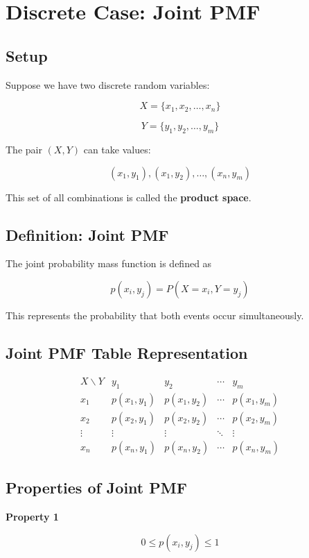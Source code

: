 \documentclass[12pt,a4paper]{article}
\begin{document}
\section{Discrete Case: Joint PMF}

\subsection{Setup}

Suppose we have two discrete random variables:

\[
X = \{x_1, x_2, \ldots, x_n\}
\]

\[
Y = \{y_1, y_2, \ldots, y_m\}
\]

The pair $(X,Y)$ can take values:

\[
(x_1,y_1),(x_1,y_2),\ldots,(x_n,y_m)
\]

This set of all combinations is called the \textbf{product space}.

\subsection{Definition: Joint PMF}

The joint probability mass function is defined as

\[
p(x_i,y_j)=P(X=x_i,Y=y_j)
\]

This represents the probability that both events occur simultaneously.

\subsection{Joint PMF Table Representation}

\[
\begin{array}{c|cccc}
X\backslash Y & y_1 & y_2 & \cdots & y_m\\
\hline
x_1 & p(x_1,y_1) & p(x_1,y_2) & \cdots & p(x_1,y_m)\\
x_2 & p(x_2,y_1) & p(x_2,y_2) & \cdots & p(x_2,y_m)\\
\vdots & \vdots & \vdots & \ddots & \vdots\\
x_n & p(x_n,y_1) & p(x_n,y_2) & \cdots & p(x_n,y_m)
\end{array}
\]

\subsection{Properties of Joint PMF}

\textbf{Property 1}

\[
0 \le p(x_i,y_j) \le 1
\]
\end{document}
